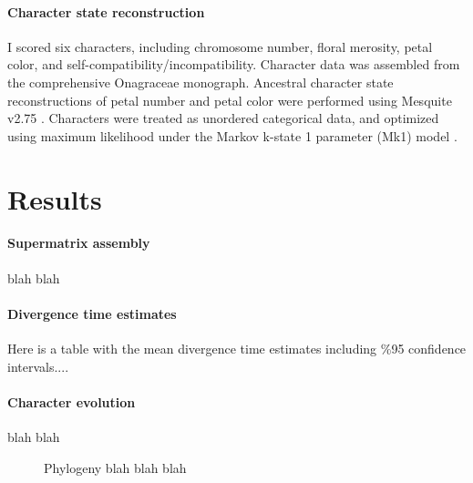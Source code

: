 \documentclass[review]{elsarticle}
\begin{document}
\paragraph{Character state reconstruction}
I scored six characters, including
chromosome number, floral merosity, petal color, and self-compatibility/incompatibility. 
Character data was assembled from the comprehensive \citet{wagner2007revised} Onagraceae monograph.
Ancestral character state reconstructions of petal number and petal color were performed using Mesquite v2.75 \citep{mesquite}.
Characters were treated as unordered categorical data, and optimized using maximum likelihood
under the Markov k-state 1 parameter (Mk1) model \citep{lewis2001likelihood}.



\section{Results}


\paragraph{Supermatrix assembly}
blah blah

\paragraph{Divergence time estimates}
Here is a table with the mean divergence time estimates including \%95 confidence intervals....

\paragraph{Character evolution}
blah blah

\begin{figure}[p]
    \vspace*{-2cm}
    \caption{Phylogeny blah blah blah}
    \label{posteriors}
\end{figure}
\end{document}
